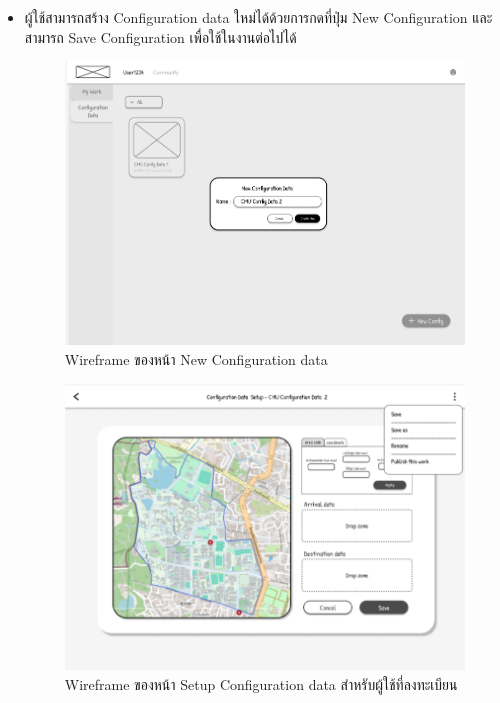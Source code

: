 \begin{mypara}
\begin{itemize}
\begin{itemize}
        \item ผู้ใช้สามารถสร้าง Configuration data ใหม่ได้ด้วยการกดที่ปุ่ม New Configuration และสามารถ Save Configuration เพื่อใช้ในงานต่อไปได้
          \begin{figure}[H]
            \centering
            \includegraphics[scale=0.4]{new_conf.png}
            \caption{Wireframe ของหน้า New Configuration data}
            \label{fig:WireframeNewConfigLogin}
          \end{figure}

          \begin{figure}[H]
            \centering
            \includegraphics[scale=0.4]{conf_setup_reg.png}
            \caption{Wireframe ของหน้า Setup Configuration data สำหรับผู้ใช้ที่ลงทะเบียน}
            \label{fig:WireframeSetupConfigLogin}
          \end{figure}


\end{itemize}
\end{itemize}
\end{mypara}
